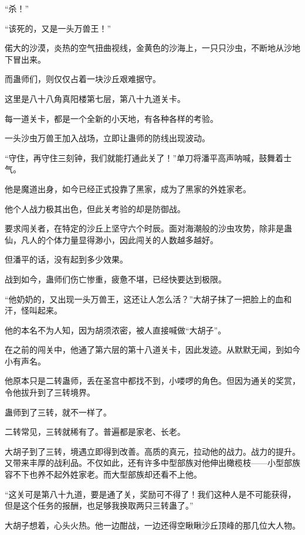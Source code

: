 
\begin{this_body}

“杀！”

“该死的，又是一头万兽王！”

偌大的沙漠，炎热的空气扭曲视线，金黄色的沙海上，一只只沙虫，不断地从沙地下冒出来。

而蛊师们，则仅仅占着一块沙丘艰难据守。

这里是八十八角真阳楼第七层，第八十九道关卡。

每一道关卡，都是一个全新的小天地，有各种各样的考验。

一头沙虫万兽王加入战场，立即让蛊师的防线出现波动。

“守住，再守住三刻钟，我们就能打通此关了！”单刀将潘平高声呐喊，鼓舞着士气。

他是魔道出身，如今已经正式投靠了黑家，成为了黑家的外姓家老。

他个人战力极其出色，但此关考验的却是防御战。

要求闯关者，在特定的沙丘上坚守六个时辰。面对海潮般的沙虫攻势，除非是蛊仙，凡人的个体力量显得渺小，因此闯关的人数越多越好。

但潘平的话，没有起到多少效果。

战到如今，蛊师们伤亡惨重，疲惫不堪，已经快要达到极限。

“他奶奶的，又出现一头万兽王，这还让人怎么活？”大胡子抹了一把脸上的血和汗，怪叫起来。

他的本名不为人知，因为胡须浓密，被人直接喊做“大胡子”。

在之前的闯关中，他通了第六层的第十八道关卡，因此发迹。从默默无闻，到如今小有声名。

他原本只是二转蛊师，丢在圣宫中都找不到，小喽啰的角色。但因为通关的奖赏，令他拔升到了三转境界。

蛊师到了三转，就不一样了。

二转常见，三转就稀有了。普遍都是家老、长老。

大胡子到了三转，境遇立即得到改善。高质的真元，拉动他的战力。战力的提升。又带来丰厚的战利品。不仅如此，还有许多中型部族对他伸出橄榄枝——小型部族容不下也养不起外姓家老。而大型部族却还看不上他。

“这关可是第八十九道，要是通了关，奖励可不得了！我们这种人是不可能获得，但是这个任务的报酬，也足够我换取两只三转蛊了。”

大胡子想着，心头火热。他一边酣战，一边还得空瞅瞅沙丘顶峰的那几位大人物。


\end{this_body}
